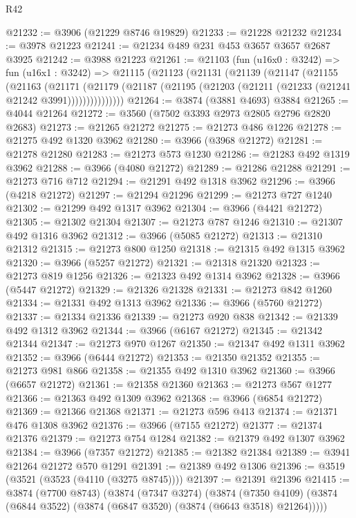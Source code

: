 \begin{lexlean}{R42}
\begin{coremodule}
@21232 := @3906 (@21229 @8746 @19829)
@21233 := @21228 @21232
@21234 := @3978 @21223
@21241 := @21234 @489 @231 @453 @3657 @3657 @2687 @3925
@21242 := @3988 @21223
@21261 := @21103
    (fun (u16x0 : @3242) =>
    fun (u16x1 : @3242) =>
    @21115
      (@21123
        (@21131
          (@21139
            (@21147
              (@21155
                (@21163
                  (@21171
                    (@21179
                      (@21187 (@21195 (@21203 (@21211 (@21233 (@21241 @21242 @3991)))))))))))))))
@21264 := @3874 (@3881 @4693) @3884
@21265 := @4044 @21264
@21272 := @3560 (@7502 @3393 @2973 @2805 @2796 @2820 @2683)
@21273 := @21265 @21272
@21275 := @21273 @486 @1226
@21278 := @21275 @492 @1320 @3962
@21280 := @3966 (@3968 @21272)
@21281 := @21278 @21280
@21283 := @21273 @573 @1230
@21286 := @21283 @492 @1319 @3962
@21288 := @3966 (@4080 @21272)
@21289 := @21286 @21288
@21291 := @21273 @716 @712
@21294 := @21291 @492 @1318 @3962
@21296 := @3966 (@4218 @21272)
@21297 := @21294 @21296
@21299 := @21273 @727 @1240
@21302 := @21299 @492 @1317 @3962
@21304 := @3966 (@4421 @21272)
@21305 := @21302 @21304
@21307 := @21273 @787 @1246
@21310 := @21307 @492 @1316 @3962
@21312 := @3966 (@5085 @21272)
@21313 := @21310 @21312
@21315 := @21273 @800 @1250
@21318 := @21315 @492 @1315 @3962
@21320 := @3966 (@5257 @21272)
@21321 := @21318 @21320
@21323 := @21273 @819 @1256
@21326 := @21323 @492 @1314 @3962
@21328 := @3966 (@5447 @21272)
@21329 := @21326 @21328
@21331 := @21273 @842 @1260
@21334 := @21331 @492 @1313 @3962
@21336 := @3966 (@5760 @21272)
@21337 := @21334 @21336
@21339 := @21273 @920 @838
@21342 := @21339 @492 @1312 @3962
@21344 := @3966 (@6167 @21272)
@21345 := @21342 @21344
@21347 := @21273 @970 @1267
@21350 := @21347 @492 @1311 @3962
@21352 := @3966 (@6444 @21272)
@21353 := @21350 @21352
@21355 := @21273 @981 @866
@21358 := @21355 @492 @1310 @3962
@21360 := @3966 (@6657 @21272)
@21361 := @21358 @21360
@21363 := @21273 @567 @1277
@21366 := @21363 @492 @1309 @3962
@21368 := @3966 (@6854 @21272)
@21369 := @21366 @21368
@21371 := @21273 @596 @413
@21374 := @21371 @476 @1308 @3962
@21376 := @3966 (@7155 @21272)
@21377 := @21374 @21376
@21379 := @21273 @754 @1284
@21382 := @21379 @492 @1307 @3962
@21384 := @3966 (@7357 @21272)
@21385 := @21382 @21384
@21389 := @3941 @21264 @21272 @570 @1291
@21391 := @21389 @492 @1306
@21396 := @3519 (@3521 (@3523 (@4110 (@3275 @8745))))
@21397 := @21391 @21396
@21415 := @3874
    (@7700 @8743)
    (@3874
      (@7347 @3274)
      (@3874
        (@7350 @4109)
        (@3874 (@6844 @3522) (@3874 (@6847 @3520) (@3874 (@6643 @3518) @21264)))))

\end{coremodule}
\end{lexlean}
